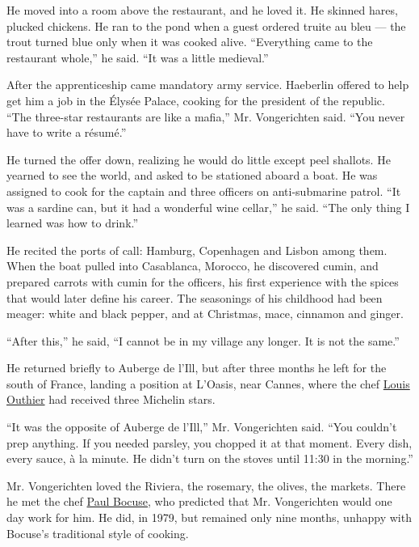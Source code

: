 He moved into a room above the restaurant, and he loved it. He skinned
hares, plucked chickens. He ran to the pond when a guest ordered truite
au bleu --- the trout turned blue only when it was cooked alive.
``Everything came to the restaurant whole,'' he said. ``It was a little
medieval.''

After the apprenticeship came mandatory army service. Haeberlin offered
to help get him a job in the Élysée Palace, cooking for the president of
the republic. ``The three-star restaurants are like a mafia,'' Mr.
Vongerichten said. ``You never have to write a résumé.''

He turned the offer down, realizing he would do little except peel
shallots. He yearned to see the world, and asked to be stationed aboard
a boat. He was assigned to cook for the captain and three officers on
anti-submarine patrol. ``It was a sardine can, but it had a wonderful
wine cellar,'' he said. ``The only thing I learned was how to drink.''

He recited the ports of call: Hamburg, Copenhagen and Lisbon among them.
When the boat pulled into Casablanca, Morocco, he discovered cumin, and
prepared carrots with cumin for the officers, his first experience with
the spices that would later define his career. The seasonings of his
childhood had been meager: white and black pepper, and at Christmas,
mace, cinnamon and ginger.

``After this,'' he said, ``I cannot be in my village any longer. It is
not the same.''

He returned briefly to Auberge de l'Ill, but after three months he left
for the south of France, landing a position at L'Oasis, near Cannes,
where the chef
\href{https://www.nytimes3xbfgragh.onion/1986/12/24/garden/from-outhier-dishes-with-hint-of-orient.html}{Louis
Outhier} had received three Michelin stars.

``It was the opposite of Auberge de l'Ill,'' Mr. Vongerichten said.
``You couldn't prep anything. If you needed parsley, you chopped it at
that moment. Every dish, every sauce, à la minute. He didn't turn on the
stoves until 11:30 in the morning.''

Mr. Vongerichten loved the Riviera, the rosemary, the olives, the
markets. There he met the chef
\href{https://www.nytimes3xbfgragh.onion/2018/01/20/obituaries/paul-bocuse-dead.html}{Paul
Bocuse}, who predicted that Mr. Vongerichten would one day work for him.
He did, in 1979, but remained only nine months, unhappy with Bocuse's
traditional style of cooking.

